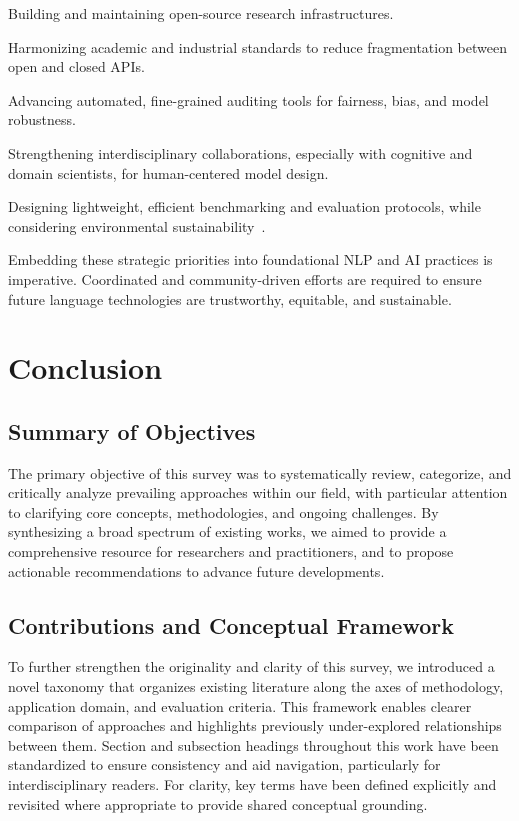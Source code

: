 \documentclass[sigconf]{acmart}
\begin{document}
Building and maintaining open-source research infrastructures.

Harmonizing academic and industrial standards to reduce fragmentation between open and closed APIs.

Advancing automated, fine-grained auditing tools for fairness, bias, and model robustness.

Strengthening interdisciplinary collaborations, especially with cognitive and domain scientists, for human-centered model design.

Designing lightweight, efficient benchmarking and evaluation protocols, while considering environmental sustainability~\cite{ref13,ref34,ref46,ref47,ref55,ref66,ref68,ref70,ref71,ref88,ref101,ref104,ref106,ref107,ref108}.

Embedding these strategic priorities into foundational NLP and AI practices is imperative. Coordinated and community-driven efforts are required to ensure future language technologies are trustworthy, equitable, and sustainable.

\section{Conclusion}

\subsection{Summary of Objectives}
The primary objective of this survey was to systematically review, categorize, and critically analyze prevailing approaches within our field, with particular attention to clarifying core concepts, methodologies, and ongoing challenges. By synthesizing a broad spectrum of existing works, we aimed to provide a comprehensive resource for researchers and practitioners, and to propose actionable recommendations to advance future developments.

\subsection{Contributions and Conceptual Framework}
To further strengthen the originality and clarity of this survey, we introduced a novel taxonomy that organizes existing literature along the axes of methodology, application domain, and evaluation criteria. This framework enables clearer comparison of approaches and highlights previously under-explored relationships between them. Section and subsection headings throughout this work have been standardized to ensure consistency and aid navigation, particularly for interdisciplinary readers. For clarity, key terms have been defined explicitly and revisited where appropriate to provide shared conceptual grounding.
\end{document}
